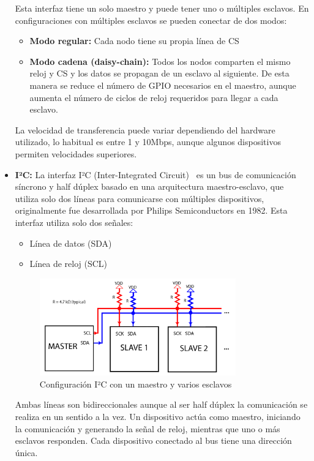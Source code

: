 \begin{itemize}
    Esta interfaz tiene un solo maestro y puede tener uno o múltiples esclavos.
    En configuraciones con múltiples esclavos se pueden conectar de dos modos:
    \begin{itemize}
        \item \textbf{Modo regular:} Cada nodo tiene su propia línea de CS
        \item \textbf{Modo cadena (daisy-chain):} Todos los nodos comparten el mismo reloj y CS y los datos se propagan de un esclavo al siguiente.
        De esta manera se reduce el número de GPIO necesarios en el maestro, aunque aumenta el número de ciclos de reloj requeridos para llegar a cada esclavo.
    \end{itemize}
    La velocidad de transferencia puede variar dependiendo del hardware utilizado, lo habitual es entre 1 y 10Mbps, aunque algunos dispositivos permiten velocidades superiores.

    \item \textbf{I²C:} La interfaz I²C (Inter-Integrated Circuit)~\cite{i2c_specification} es un bus de comunicación síncrono y half dúplex basado en una arquitectura maestro-esclavo, que utiliza solo dos líneas para comunicarse con múltiples dispositivos,
    originalmente fue desarrollada por Philips Semiconductors en 1982.
    Esta interfaz utiliza solo dos señales:
    \begin{itemize}
        \item Línea de datos (SDA)
        \item Línea de reloj (SCL)
    \end{itemize}
    \begin{figure}[h]
        \centering
        \includegraphics[width=0.8\textwidth]{Imagenes/Bitmap/i2c}
        \caption{Configuración I²C con un maestro y varios esclavos}
        \label{fig:i2c}
    \end{figure}
    Ambas líneas son bidireccionales aunque al ser half dúplex la comunicación se realiza en un sentido a la vez.
    Un dispositivo actúa como maestro, iniciando la comunicación y generando la señal de reloj, mientras que uno o más esclavos responden.
    Cada dispositivo conectado al bus tiene una dirección única.


\end{itemize}
